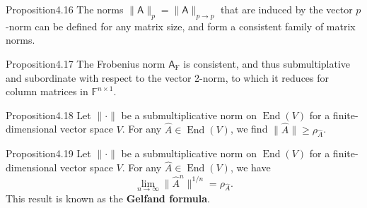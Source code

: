 \begin{res}{Proposition}{4.16}
The norms $\|\mathsf A\|_p=\|\mathsf A\|_{p\to p}$ that are induced by the vector $p$-norm can be defined for any matrix size, and form a consistent family of matrix norms.
\end{res}

\begin{res}{Proposition}{4.17}
The Frobenius norm $\mathsf A_{\mathrm F}$ is consistent, and thus submultiplative and subordinate with respect to the vector 2-norm, to which it reduces for column matrices in $\mathbb F^{n\times1}$.
\end{res}

\begin{res}{Proposition}{4.18}
Let $\|\cdot\|$ be a submultiplicative norm on $\operatorname{End}(V)$ for a finite-dimensional vector space $V$. For any $\hat A\in\operatorname{End}(V)$, we find $\|\hat A\|\ge\rho_{\hat A}$.
\end{res}

\begin{res}{Proposition}{4.19}
Let $\|\cdot\|$ be a submultiplicative norm on $\operatorname{End}(V)$ for a finite-dimensional vector space $V$. For any $\hat A\in\operatorname{End}(V)$, we have
\begin{equation}\lim_{n\to\infty}\|\hat A^n\|^{1/n}=\rho_{\hat A}.\tag{4.24}\end{equation}
This result is known as the \textbf{Gelfand formula}.
\end{res}
